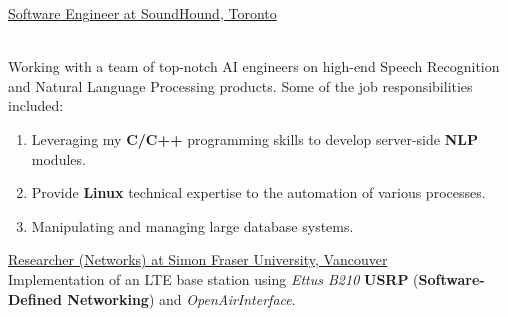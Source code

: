 \documentclass[letterpaper]{twentysecondcv} %
\begin{document}
\begin{twenty}
             {\underline{Software Engineer at \textcolor{OliveGreen}{SoundHound}, Toronto}}
             {}
             {\\
              Working with a team of top-notch AI engineers on high-end Speech Recognition and Natural Language Processing products. Some of the job responsibilities included:
              \\
              \begin{enumerate}
                 \item{Leveraging my \textbf{C/C++} programming skills to develop server-side \textbf{NLP} modules.}
                 \item{Provide \textbf{Linux} technical expertise to the automation of various processes.}
                 \item{Manipulating and managing large database systems.}
              \end{enumerate}
             }

               {\underline{Researcher (Networks) at \textcolor{OliveGreen}{Simon Fraser University}, Vancouver}}
               {}
               {\\
                Implementation of an LTE base station using \textit{Ettus B210} \textbf{USRP} (\textbf{Software-Defined Networking}) and \textit{OpenAirInterface}.
               }




\end{twenty}
\end{document}
